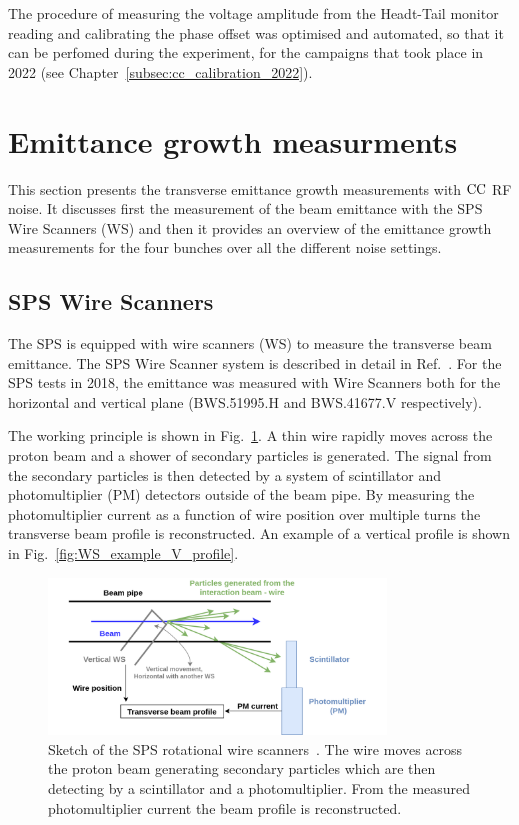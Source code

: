 The procedure of measuring the voltage amplitude from the Headt-Tail monitor reading and calibrating the phase offset was optimised and automated, so that it can be perfomed during the experiment, for the campaigns that took place in 2022 (see Chapter~\ref{subsec:cc_calibration_2022}). 

\section{Emittance growth measurments}\label{sec:emit_growth_meas_2018}
This section presents the transverse emittance growth measurements with ${\mathrm{CC}}$ RF noise. It discusses first the measurement of the beam emittance with the SPS Wire Scanners (WS) and then it provides an overview of the emittance growth measurements for the four bunches over all the different noise settings.

\subsection{SPS Wire Scanners}\label{subsec:sps_ws}
The SPS is equipped with wire scanners (WS) to measure the transverse beam emittance. The SPS Wire Scanner system is described in detail in Ref.~\cite{BOSSER1985475, Berrig:1972478}. For the SPS tests in 2018, the emittance was measured with Wire Scanners both for the horizontal and vertical plane (BWS.51995.H and BWS.41677.V respectively).

The working principle is shown in Fig.~\ref{fig:SPS_WS_ROT}. A thin wire rapidly moves across the proton beam and a shower of secondary particles is generated. The signal from the secondary particles is then detected by a system of scintillator and photomultiplier (PM) detectors outside of the beam pipe. By measuring the photomultiplier current as a function of wire position over multiple turns the transverse beam profile is reconstructed. An example of a vertical profile is shown in Fig.~\ref{fig:WS_example_V_profile}.

\begin{figure}[!h]
   \centering         
   \includegraphics[width=0.8\textwidth]{images/Ch5/Wire_scanner.png}
       \caption{Sketch of the SPS rotational wire scanners~\cite{Berrig:1972478}. The wire moves across the proton beam generating secondary particles which are then detecting by a scintillator and a photomultiplier. From the measured photomultiplier current the beam profile is reconstructed.}
       \label{fig:SPS_WS_ROT}
\end{figure}
